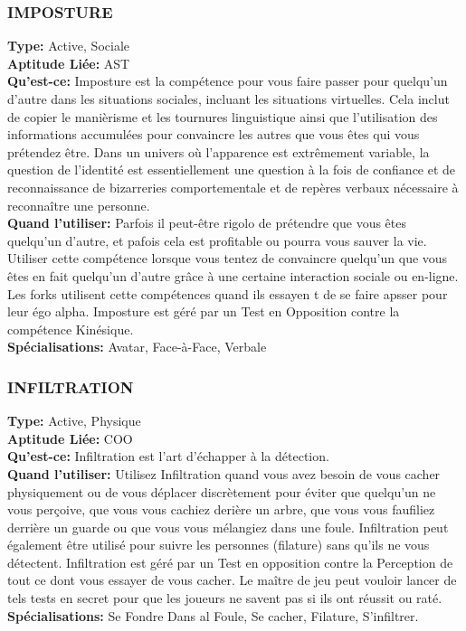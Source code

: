 \subsubsection{IMPOSTURE} \textbf{Type:} Active, Sociale \\ \textbf{Aptitude Liée:} AST \\ \textbf{Qu'est-ce:} Imposture est la compétence pour vous faire passer pour quelqu'un d'autre dans les situations sociales, incluant les situations virtuelles. Cela inclut de copier le manièrisme et les tournures linguistique ainsi que l'utilisation des informations accumulées pour convaincre les autres que vous êtes qui vous prétendez être. Dans un univers où l'apparence est extrêmement variable, la question de l'identité est essentiellement une question à la fois de confiance et de reconnaissance de bizarreries comportementale et de repères verbaux  nécessaire à reconnaître une personne. \\ \textbf{Quand l'utiliser:} Parfois il peut-être rigolo de prétendre que vous êtes quelqu'un d'autre, et pafois cela est profitable ou pourra vous sauver la vie. Utiliser cette compétence lorsque vous tentez de convaincre quelqu'un que vous êtes en fait quelqu'un d'autre grâce à une certaine interaction sociale ou en-ligne. Les forks utilisent cette compétences quand ils essayen t de se faire apsser pour leur égo alpha. Imposture est géré par un Test en Opposition contre la compétence Kinésique. \\ \textbf{Spécialisations:} Avatar, Face-à-Face, Verbale 

\subsubsection{INFILTRATION} \textbf{Type:} Active, Physique\\ \textbf{Aptitude Liée:} COO \\ \textbf{Qu'est-ce:} Infiltration est l'art d'échapper à la détection. \\ \textbf{Quand l'utiliser:} Utilisez Infiltration quand vous avez besoin de vous cacher physiquement ou de vous déplacer discrètement pour éviter que quelqu'un ne vous perçoive, que vous vous cachiez derière un arbre, que vous vous faufiliez derrière un guarde ou que vous vous mélangiez dans une foule. Infiltration peut également être utilisé pour suivre les personnes (filature) sans qu'ils ne vous détectent. Infiltration est géré par un Test en opposition contre la Perception de tout ce dont vous essayer de vous cacher. Le maître de jeu peut vouloir lancer de tels tests en secret pour que les joueurs ne savent pas si ils ont réussit ou raté. \\ \textbf{Spécialisations:} Se Fondre Dans al Foule, Se cacher, Filature, S'infiltrer. 

